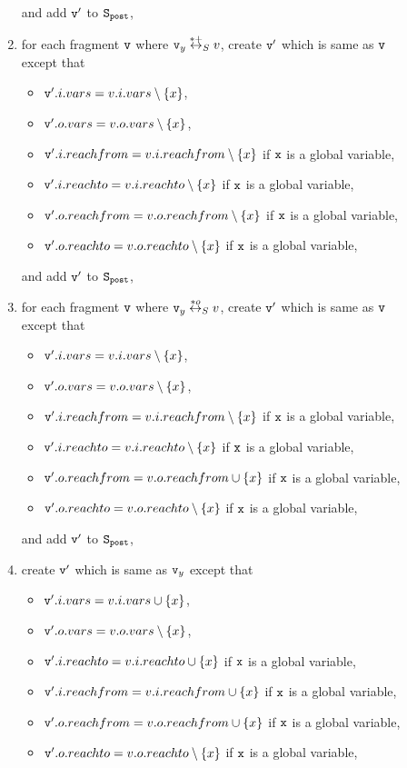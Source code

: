 \begin{description}
\begin{enumerate}
\begin{itemize}
\end{itemize}
and add $\mathtt{v}'$ to $\tt S_{post}$,
\item for each fragment $\mathtt{v}$ where $\mathtt{v}_y \overset{*+}\leftrightarrow_S v$, create $\mathtt{v}'$ which is same as $\mathtt{v}$ except that
\begin{itemize}
\item $\mathtt{v}'.i.vars = v.i.vars \setminus \{x\}$,
\item $\mathtt{v}'.o.vars = v.o.vars \setminus \{x\}$,
\item $\mathtt{v}'.i.reachfrom = v.i.reachfrom \setminus \{x\}$ if $\tt x$ is a global variable,
\item $\mathtt{v}'.i.reachto = v.i.reachto \setminus \{x\}$ if $\tt x$ is a global variable,
\item $\mathtt{v}'.o.reachfrom = v.o.reachfrom \setminus \{x\}$ if $\tt x$ is a global variable,
\item $\mathtt{v}'.o.reachto = v.o.reachto \setminus \{x\}$ if $\tt x$ is a global variable,
\end{itemize}
and add $\mathtt{v}'$ to $\tt S_{post}$,
\item for each fragment $\mathtt{v}$ where $\mathtt{v}_y \overset{*o}\leftrightarrow_S v$, create $\mathtt{v}'$ which is same as $\mathtt{v}$ except that
\begin{itemize}
\item $\mathtt{v}'.i.vars = v.i.vars \setminus \{x\}$,
\item $\mathtt{v}'.o.vars = v.o.vars \setminus \{x\}$,
\item $\mathtt{v}'.i.reachfrom = v.i.reachfrom \setminus \{x\}$ if $\tt x$ is a global variable,
\item $\mathtt{v}'.i.reachto = v.i.reachto \setminus \{x\}$ if $\tt x$ is a global variable,
\item $\mathtt{v}'.o.reachfrom = v.o.reachfrom \cup \{x\}$ if $\tt x$ is a global variable,
\item $\mathtt{v}'.o.reachto = v.o.reachto \setminus \{x\}$ if $\tt x$ is a global variable,

\end{itemize}
and add $\mathtt{v}'$ to $\tt S_{post}$,
\item create $\mathtt{v}'$ which is same as $\mathtt{v}_y$ except that
\begin{itemize}
\item $\mathtt{v}'.i.vars = v.i.vars \cup \{x\}$,
\item $\mathtt{v}'.o.vars = v.o.vars \setminus \{x\}$,
\item $\mathtt{v}'.i.reachto = v.i.reachto \cup \{x\}$ if $\tt x$ is a global variable,
 \item $\mathtt{v}'.i.reachfrom = v.i.reachfrom \cup \{x\}$ if $\tt x$ is a global variable,
\item $\mathtt{v}'.o.reachfrom = v.o.reachfrom \cup \{x\}$ if $\tt x$ is a global variable,
\item $\mathtt{v}'.o.reachto = v.o.reachto \setminus \{x\}$ if $\tt x$ is a global variable,


\end{itemize}
\end{enumerate}
\end{description}
